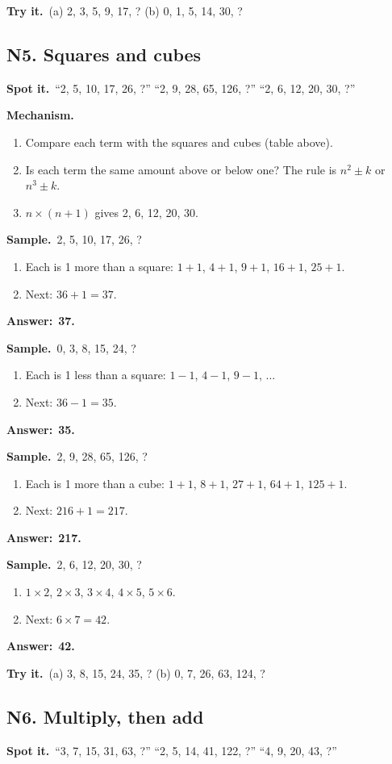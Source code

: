 \documentclass[11pt,a4paper]{article}
\let\oldsubsection\subsection
\renewcommand{\subsection}{\needspace{9\baselineskip}\oldsubsection}
\newcommand{\spot}{\textbf{\color{ember}Spot it.}\ }
\newcommand{\mech}{\textbf{\color{ember}Mechanism.}\ }
\newif\ifkeepsamp
\newcommand{\ans}[1]{\par\nopagebreak\noindent\textbf{\color{ember}Answer:}\ \textbf{#1}\par}
\newcommand{\samp}{\ifkeepsamp\needspace{4\baselineskip}\fi\textbf{\color{ember}Sample.}\ }
\newcommand{\tryit}[1]{\textbf{\color{ember}Try it.}\ #1}
\begin{document}
\tryit (a) 2, 3, 5, 9, 17, ? (b) 0, 1, 5, 14, 30, ?

\subsection{N5. Squares and cubes}
\spot ``2, 5, 10, 17, 26, ?'' ``2, 9, 28, 65, 126, ?'' ``2, 6, 12, 20, 30, ?''

\mech
\begin{enumerate}
\item Compare each term with the squares and cubes (table above).
\item Is each term the same amount above or below one? The rule is $n^2 \pm k$ or $n^3 \pm k$.
\item $n \times (n + 1)$ gives 2, 6, 12, 20, 30.
\end{enumerate}

\samp 2, 5, 10, 17, 26, ?
\begin{enumerate}
\item Each is 1 more than a square: $1 + 1$, $4 + 1$, $9 + 1$, $16 + 1$, $25 + 1$.
\item Next: $36 + 1 = 37$.
\end{enumerate}
\ans{37.}

\samp 0, 3, 8, 15, 24, ?
\begin{enumerate}
\item Each is 1 less than a square: $1 - 1$, $4 - 1$, $9 - 1$, ...
\item Next: $36 - 1 = 35$.
\end{enumerate}
\ans{35.}

\samp 2, 9, 28, 65, 126, ?
\begin{enumerate}
\item Each is 1 more than a cube: $1 + 1$, $8 + 1$, $27 + 1$, $64 + 1$, $125 + 1$.
\item Next: $216 + 1 = 217$.
\end{enumerate}
\ans{217.}

\samp 2, 6, 12, 20, 30, ?
\begin{enumerate}
\item $1 \times 2$, $2 \times 3$, $3 \times 4$, $4 \times 5$, $5 \times 6$.
\item Next: $6 \times 7 = 42$.
\end{enumerate}
\ans{42.}

\tryit (a) 3, 8, 15, 24, 35, ? (b) 0, 7, 26, 63, 124, ?

\subsection{N6. Multiply, then add}
\spot ``3, 7, 15, 31, 63, ?'' ``2, 5, 14, 41, 122, ?'' ``4, 9, 20, 43, ?''
\end{document}

